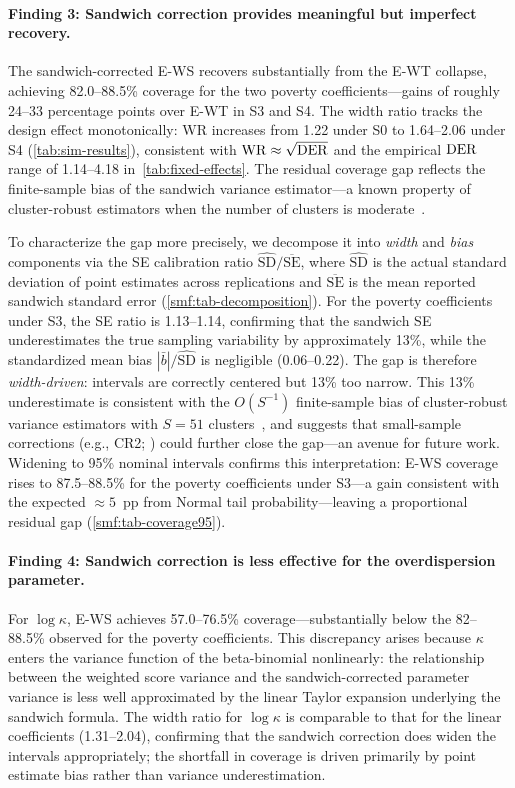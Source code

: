 \paragraph{Finding 3: Sandwich correction provides meaningful but
imperfect recovery.}
The sandwich-corrected E-WS recovers substantially from the E-WT
collapse, achieving 82.0--88.5\% coverage for the two poverty
coefficients---gains of roughly 24--33 percentage points over E-WT in
S3 and S4. The width ratio tracks the design effect monotonically:
WR increases from 1.22 under S0 to 1.64--2.06 under S4
(\cref{tab:sim-results}), consistent with
$\mathrm{WR} \approx \sqrt{\operatorname{DER}}$ and the empirical $\operatorname{DER}$ range
of 1.14--4.18 in~\cref{tab:fixed-effects}. The residual coverage gap
reflects the finite-sample bias of the sandwich variance
estimator---a known property of cluster-robust estimators when the
number of clusters is moderate~\citep{Binder1983}.

To characterize the gap more precisely, we decompose it into
\emph{width} and \emph{bias} components via the SE calibration ratio
$\widehat{\mathrm{SD}} / \overline{\mathrm{SE}}$, where
$\widehat{\mathrm{SD}}$ is the actual standard deviation of point
estimates across replications and $\overline{\mathrm{SE}}$ is the mean
reported sandwich standard error
(\cref{smf:tab-decomposition}).  For the poverty coefficients under
S3, the SE ratio is 1.13--1.14, confirming that the sandwich SE
underestimates the true sampling variability by approximately 13\%,
while the standardized mean bias $|\bar{b}|/\widehat{\mathrm{SD}}$ is
negligible (0.06--0.22).  The gap is therefore \emph{width-driven}:
intervals are correctly centered but 13\% too narrow.  This 13\%
underestimate is consistent with the $O(S^{-1})$ finite-sample bias of
cluster-robust variance estimators with $S = 51$
clusters~\citep{Binder1983}, and suggests that small-sample corrections
(e.g., CR2; \citealp{PustejovskyTipton2018}) could further
close the gap---an avenue for future work.  Widening to
95\% nominal intervals confirms this interpretation: E-WS coverage
rises to 87.5--88.5\% for the poverty coefficients under S3---a gain
consistent with the expected $\approx 5$~pp from Normal tail
probability---leaving a proportional residual gap
(\cref{smf:tab-coverage95}).

\paragraph{Finding 4: Sandwich correction is less effective for the
overdispersion parameter.}
For $\log\kappa$, E-WS achieves 57.0--76.5\% coverage---substantially
below the 82--88.5\% observed for the poverty coefficients. This
discrepancy arises because $\kappa$ enters the variance function of the
beta-binomial nonlinearly: the relationship between the weighted
score variance and the sandwich-corrected parameter variance is less
well approximated by the linear Taylor expansion underlying the sandwich
formula. The width ratio for $\log\kappa$ is comparable to that for the
linear coefficients (1.31--2.04), confirming that the sandwich
correction does widen the intervals appropriately; the shortfall in
coverage is driven primarily by point estimate bias rather than variance
underestimation.

